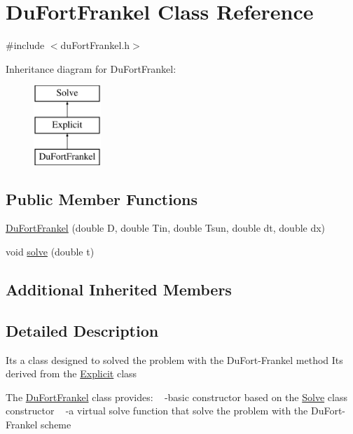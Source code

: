 \hypertarget{class_du_fort_frankel}{}\section{Du\+Fort\+Frankel Class Reference}
\label{class_du_fort_frankel}


{\ttfamily \#include $<$du\+Fort\+Frankel.\+h$>$}

Inheritance diagram for Du\+Fort\+Frankel\+:\begin{figure}[H]
\begin{center}
\leavevmode
\includegraphics[height=3.000000cm]{class_du_fort_frankel}
\end{center}
\end{figure}
\subsection*{Public Member Functions}
\begin{DoxyCompactItemize}
\item 
\hyperlink{class_du_fort_frankel_ab9a6490d0fd3b08e7e22fba2ade16c19}{Du\+Fort\+Frankel} (double D, double Tin, double Tsun, double dt, double dx)
\item 
void \hyperlink{class_du_fort_frankel_a73204223c7ace1e3f95e5d89d02c5208}{solve} (double t)
\end{DoxyCompactItemize}
\subsection*{Additional Inherited Members}


\subsection{Detailed Description}
It\textquotesingle{}s a class designed to solved the problem with the Du\+Fort-\/\+Frankel method It\textquotesingle{}s derived from the \hyperlink{class_explicit}{Explicit} class

The \hyperlink{class_du_fort_frankel}{Du\+Fort\+Frankel} class provides\+: ~\newline
-\/basic constructor based on the \hyperlink{class_solve}{Solve} class constructor ~\newline
-\/a virtual solve function that solve the problem with the Du\+Fort-\/\+Frankel scheme 

